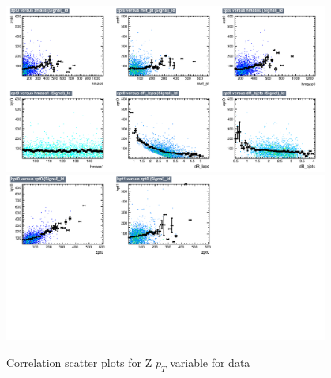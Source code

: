 \begin{figure}[!htb]%
\centering
\includegraphics[width=0.95\textwidth]{figures/CRTT/dataset/plots/correlationscatter_zpt0__Id_c1.pdf}
\includegraphics[width=0.95\textwidth]{figures/CRTT/dataset/plots/correlationscatter_zpt0__Id_c2.pdf}
\caption{ Correlation scatter plots for Z $p_{T}$  variable for data}%
\label{fig:correlations_CRTT_zpt_S}                                                       
\end{figure}



